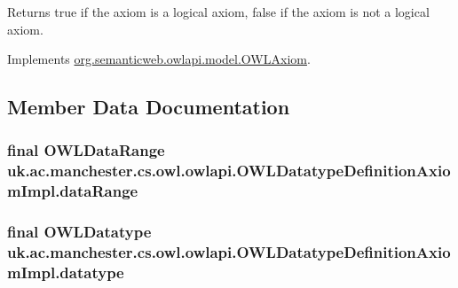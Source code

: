 \begin{DoxyReturn}{Returns}
{\ttfamily true} if the axiom is a logical axiom, {\ttfamily false} if the axiom is not a logical axiom. 
\end{DoxyReturn}


Implements \hyperlink{interfaceorg_1_1semanticweb_1_1owlapi_1_1model_1_1_o_w_l_axiom_a418ae7ad8e90290ef5b05e13ec777054}{org.\-semanticweb.\-owlapi.\-model.\-O\-W\-L\-Axiom}.



\subsection{Member Data Documentation}
\hypertarget{classuk_1_1ac_1_1manchester_1_1cs_1_1owl_1_1owlapi_1_1_o_w_l_datatype_definition_axiom_impl_a1486c60b9a09c2ece01b9c00e8742920}{
\subsubsection[{data\-Range}]{\setlength{\rightskip}{0pt plus 5cm}final {\bf O\-W\-L\-Data\-Range} uk.\-ac.\-manchester.\-cs.\-owl.\-owlapi.\-O\-W\-L\-Datatype\-Definition\-Axiom\-Impl.\-data\-Range\hspace{0.3cm}{\ttfamily [private]}}}\label{classuk_1_1ac_1_1manchester_1_1cs_1_1owl_1_1owlapi_1_1_o_w_l_datatype_definition_axiom_impl_a1486c60b9a09c2ece01b9c00e8742920}
\hypertarget{classuk_1_1ac_1_1manchester_1_1cs_1_1owl_1_1owlapi_1_1_o_w_l_datatype_definition_axiom_impl_a82c80819ac61bd227d2e74ddeb19a4d6}{
\subsubsection[{datatype}]{\setlength{\rightskip}{0pt plus 5cm}final {\bf O\-W\-L\-Datatype} uk.\-ac.\-manchester.\-cs.\-owl.\-owlapi.\-O\-W\-L\-Datatype\-Definition\-Axiom\-Impl.\-datatype\hspace{0.3cm}{\ttfamily [private]}}}\label{classuk_1_1ac_1_1manchester_1_1cs_1_1owl_1_1owlapi_1_1_o_w_l_datatype_definition_axiom_impl_a82c80819ac61bd227d2e74ddeb19a4d6}
